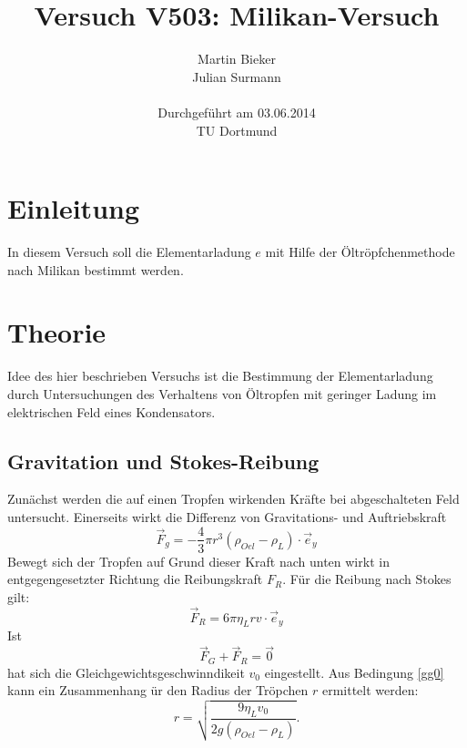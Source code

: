 \documentclass[11pt,ngerman,a4paper]{article}
\title{\textbf{Versuch V503: Milikan-Versuch}}
\author{Martin Bieker\\
		Julian Surmann\\
		\\
		Durchgef\"{u}hrt am 03.06.2014\\
		TU Dortmund}
\date{}
\begin{document}
\renewcommand\tablename{Tabelle}
\renewcommand\figurename{Abbildung}
\maketitle
\thispagestyle{empty}
\newpage
\clearpage
\setcounter{page}{1}


\section{Einleitung}
In diesem Versuch soll die Elementarladung $e$ mit Hilfe der \"Oltr\"opfchenmethode nach Milikan bestimmt werden.
\section{Theorie}
Idee des hier beschrieben Versuchs ist die Bestimmung der Elementarladung durch Untersuchungen des Verhaltens von \"Oltropfen mit geringer Ladung im elektrischen Feld eines Kondensators. 
\subsection{Gravitation und Stokes-Reibung}
Zun\"achst werden die auf einen Tropfen wirkenden Kr\"afte bei abgeschalteten Feld untersucht. Einerseits wirkt die Differenz von Gravitations- und Auftriebskraft
\[
\vec F_g = -\frac43\pi r^3\left(\rho_{Oel}-\rho_{L}\right)\cdot \vec e_y
\]
Bewegt sich der Tropfen auf Grund dieser Kraft nach unten wirkt in entgegengesetzter Richtung die Reibungskraft $F_R$. F\"ur die Reibung nach Stokes gilt:
\[
\vec F_R = 6\pi \eta_{L}rv \cdot \vec e_y
\]
Ist 
\begin{equation}
\vec F_G + \vec F_R = \vec 0
\label{gg0}
\end{equation}
hat sich die Gleichgewichtsgeschwinndikeit $v_0$  eingestellt. Aus Bedingung \ref{gg0} kann ein Zusammenhang \"ur den Radius der Tr\"opchen $r$ ermittelt werden:
\begin{equation}
r = \sqrt{\frac{9 \eta_L v_0}{2g\left(\rho_{Oel}-\rho_{L}\right)}}\mathrm{.}
\label{rv0}
\end{equation}
\end{document}
